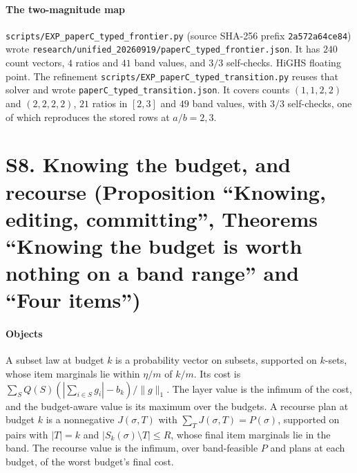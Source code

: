\paragraph{The two-magnitude map} \texttt{scripts/EXP\_paperC\_typed\_frontier.py} (source
SHA-256 prefix \texttt{2a572a64ce84}) wrote
\texttt{research/unified\_20260919/paperC\_typed\_frontier.json}. It has $240$ count vectors,
$4$ ratios and $41$ band values, and $3/3$ self-checks. HiGHS floating point. The refinement
\texttt{scripts/EXP\_paperC\_typed\_transition.py} reuses that solver and wrote
\texttt{paperC\_typed\_transition.json}. It covers counts $(1,1,2,2)$ and $(2,2,2,2)$, $21$
ratios in $[2,3]$ and $49$ band values, with $3/3$ self-checks, one of which reproduces the
stored rows at $a/b=2,3$. \NUM{}

\section{S8. Knowing the budget, and recourse (Proposition ``Knowing, editing, committing'',
Theorems ``Knowing the budget is worth nothing on a band range'' and ``Four items'')}

\paragraph{Objects} A subset law at budget $k$ is a probability vector on subsets, supported on
$k$-sets, whose item marginals lie within $\eta/m$ of $k/m$. Its cost is
$\sum_SQ(S)(|\sum_{i\in S}g_i|-b_k)/\|g\|_1$. The layer value is the infimum of the cost, and the
budget-aware value is its maximum over the budgets. A recourse plan at budget $k$ is a
nonnegative $J(\sigma,T)$ with $\sum_TJ(\sigma,T)=P(\sigma)$, supported on pairs with $|T|=k$ and
$|S_k(\sigma)\setminus T|\le R$, whose final item marginals lie in the band. The recourse value
is the infimum, over band-feasible $P$ and plans at each budget, of the worst budget's final cost.

